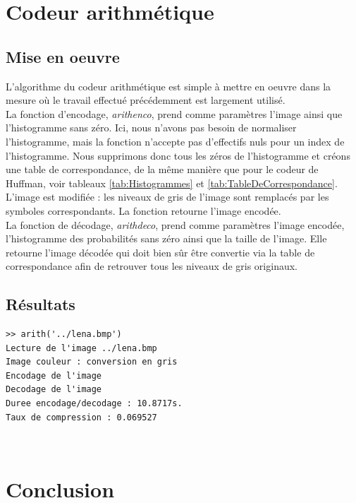 \documentclass[a4paper, 12pt]{article}
\begin{document}
\section{Codeur arithmétique}

\subsection{Mise en oeuvre}

L'algorithme du codeur arithmétique est simple à mettre en oeuvre dans la mesure où le travail effectué précédemment est largement utilisé. \\

La fonction d'encodage, \textit{arithenco}, prend comme paramètres l'image ainsi que l'histogramme sans zéro. Ici, nous n'avons pas besoin de normaliser l'histogramme, mais la fonction n'accepte pas d'effectifs nuls pour un index de l'histogramme. Nous supprimons donc tous les zéros de l'histogramme et créons une table de correspondance, de la même manière que pour le codeur de Huffman, voir tableaux \ref{tab:Histogrammes} et \ref{tab:TableDeCorrespondance}. L'image est modifiée : les niveaux de gris de l'image sont remplacés par les symboles correspondants. La fonction retourne l'image encodée.\\

La fonction de décodage, \textit{arithdeco}, prend comme paramètres l'image encodée, l'histogramme des probabilités sans zéro ainsi que la taille de l'image. Elle retourne l'image décodée qui doit bien sûr être convertie via la table de correspondance afin de retrouver tous les niveaux de gris originaux. \\

\subsection{Résultats}

\begin{verbatim}
>> arith('../lena.bmp')
Lecture de l'image ../lena.bmp
Image couleur : conversion en gris
Encodage de l'image
Decodage de l'image
Duree encodage/decodage : 10.8717s.
Taux de compression : 0.069527
\end{verbatim} \\

\newpage

\section{Conclusion}
\end{document}
